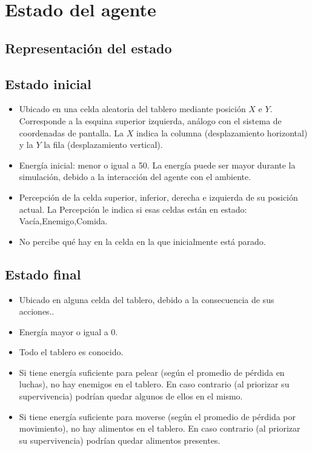 \section{Estado del agente}

\subsection{Representación del estado}

\subsection{Estado inicial}

\begin{itemize}
\item Ubicado en una celda aleatoria del tablero mediante posición $X$ e $Y$. Corresponde a la esquina superior izquierda, análogo con el sistema de coordenadas de pantalla. La $X$ indica la columna (desplazamiento horizontal) y la $Y$ la fila (desplazamiento vertical).
\item Energía inicial: menor o igual a 50. La energía puede ser mayor durante la simulación, debido a la interacción del agente con el ambiente.
\item Percepción de la celda superior, inferior, derecha e izquierda de su posición actual. La Percepción le indica si esas celdas están en estado: Vacía,Enemigo,Comida.
\item No percibe qué hay en la celda en la que inicialmente está parado.
\end{itemize}

\subsection{Estado final}

\begin{itemize}
\item Ubicado en alguna celda del tablero, debido a la consecuencia de sus acciones..
\item Energía mayor o igual a 0.
\item Todo el tablero es conocido.
\item Si tiene energía suficiente para pelear (según el promedio de pérdida en
luchas), no hay enemigos en el tablero. En caso contrario (al priorizar su
supervivencia) podrían quedar algunos de ellos en el mismo.
\item Si tiene energía suficiente para moverse (según el promedio de pérdida
por movimiento), no hay alimentos en el tablero. En caso contrario (al priorizar
su supervivencia) podrían quedar alimentos presentes.
\end{itemize}
